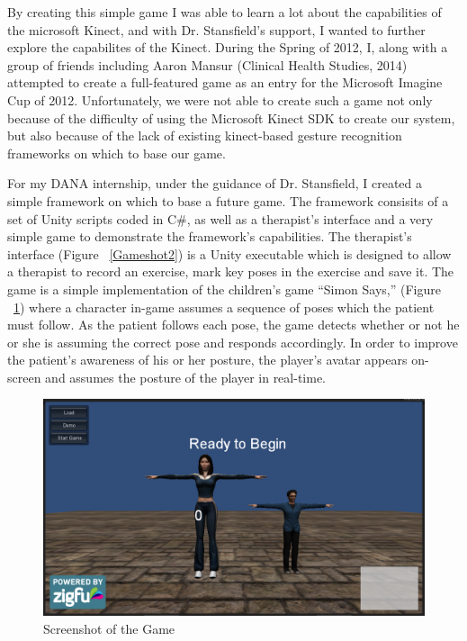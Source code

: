\documentclass{report}
\begin{document}
By creating this simple game I was able to learn a lot about the capabilities of the microsoft Kinect, and with Dr. Stansfield's support, I wanted to further explore the capabilites of the Kinect. During the Spring of 2012, I, along with a group of friends including Aaron Mansur (Clinical Health Studies, 2014) attempted to create a full-featured game as an entry for the Microsoft Imagine Cup of 2012. Unfortunately, we were not able to create such a game not only because of the difficulty of using the Microsoft Kinect SDK to create our system, but also because of the lack of existing kinect-based gesture recognition frameworks on which to base our game. 

For my DANA internship, under the guidance of Dr. Stansfield, I created a simple framework on which to base a future game. The framework consisits of a set of Unity scripts coded in C\#, as well as a therapist's interface and a very simple game to demonstrate the framework's capabilities. The therapist's interface (Figure ~\ref{Gameshot2}) is a Unity executable which is designed to allow a therapist to record an exercise, mark key poses in the exercise and save it. The game is a simple implementation of the children's game ``Simon Says,'' (Figure ~\ref{Gameshot}) where a character in-game assumes a sequence of poses which the patient must follow. As the patient follows each pose, the game detects whether or not he or she is assuming the correct pose and responds accordingly. In order to improve the patient's awareness of his or her posture, the player's avatar appears on-screen and assumes the posture of the player in real-time.

\begin{figure}[htb]
	\includegraphics[width=\linewidth]{Game.png}
	\caption{Screenshot of the Game}
	\label{Gameshot}
\end{figure}
\end{document}
